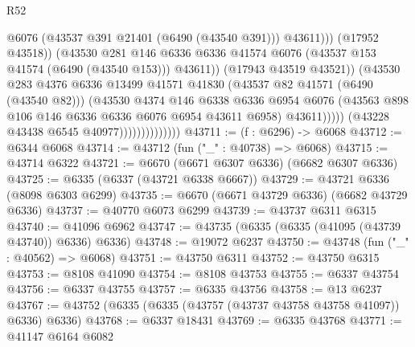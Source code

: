 \begin{lexlean}{R52}
\begin{coremodule}
                                                @6076
                                                (@43537 @391 @21401 (@6490 (@43540 @391)))
                                                @43611)))
                                          (@17952 @43518))
                                        (@43530
                                          @281
                                          @146
                                          @6336
                                          @6336
                                          @41574
                                          @6076
                                          (@43537 @153 @41574 (@6490 (@43540 @153)))
                                          @43611))
                                      (@17943 @43519 @43521))
                                    (@43530
                                      @283
                                      @4376
                                      @6336
                                      @13499
                                      @41571
                                      @41830
                                      (@43537 @82 @41571 (@6490 (@43540 @82)))
                                      (@43530
                                        @4374
                                        @146
                                        @6338
                                        @6336
                                        @6954
                                        @6076
                                        (@43563 @898 @106 @146 @6336 @6336 @6076 @6954 @43611 @6958)
                                        @43611)))))
                              (@43228 @43438 @6545 @40977))))))))))))))
@43711 := (f : @6296) -> @6068
@43712 := @6344 @6068
@43714 := @43712 (fun ("_" : @40738) => @6068)
@43715 := @43714 @6322
@43721 := @6670 (@6671 @6307 @6336) (@6682 @6307 @6336)
@43725 := @6335 (@6337 (@43721 @6338 @6667))
@43729 := @43721 @6336 (@8098 @6303 @6299)
@43735 := @6670 (@6671 @43729 @6336) (@6682 @43729 @6336)
@43737 := @40770 @6073 @6299
@43739 := @43737 @6311 @6315
@43740 := @41096 @6962
@43747 := @43735 (@6335 (@6335 (@41095 (@43739 @43740)) @6336) @6336)
@43748 := @19072 @6237
@43750 := @43748 (fun ("_" : @40562) => @6068)
@43751 := @43750 @6311
@43752 := @43750 @6315
@43753 := @8108 @41090
@43754 := @8108 @43753
@43755 := @6337 @43754
@43756 := @6337 @43755
@43757 := @6335 @43756
@43758 := @13 @6237
@43767 := @43752 (@6335 (@6335 (@43757 (@43737 @43758 @43758 @41097)) @6336) @6336)
@43768 := @6337 @18431
@43769 := @6335 @43768
@43771 := @41147 @6164 @6082

\end{coremodule}
\end{lexlean}
